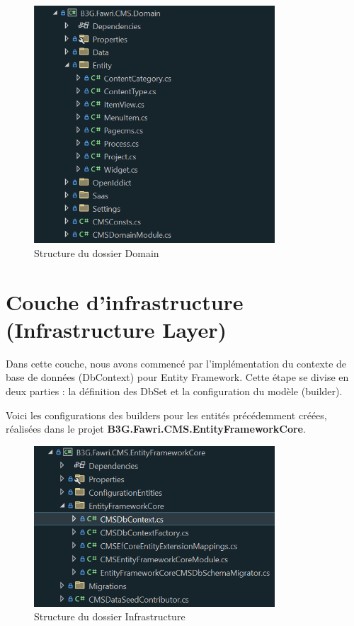 \begin{figure}[H]
    \centering
    \includegraphics[width=9cm]{Figures/domain folder.PNG}
    \caption{Structure du dossier Domain}
\end{figure}

\section{Couche d'infrastructure (Infrastructure Layer)}

Dans cette couche, nous avons commencé par l'implémentation du contexte de base de données (DbContext) pour Entity Framework. Cette étape se divise en deux parties : la définition des DbSet et la configuration du modèle (builder).

Voici les configurations des builders pour les entités précédemment créées, réalisées dans le projet \textbf{B3G.Fawri.CMS.EntityFrameworkCore}.


\begin{figure}[H]
    \centering
    \includegraphics[width=9cm]{Figures/entity fram core folder.PNG}
    \caption{Structure du dossier Infrastructure}
\end{figure}


